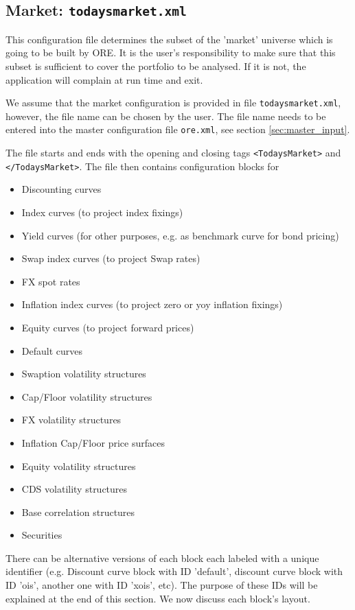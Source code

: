 \documentclass[12pt, a4paper]{article}
\begin{document}
\subsection{Market: {\tt todaysmarket.xml}}\label{sec:market}

This configuration file determines the subset of the 'market' universe which is going to be built by ORE. It is the
user's responsibility to make sure that this subset is sufficient to cover the portfolio to be analysed. If it is not,
the application will complain at run time and exit.

\medskip We assume that the market configuration is provided in file {\tt todaysmarket.xml}, however, the file name can
be chosen by the user. The file name needs to be entered into the master configuration file {\tt ore.xml}, see section
\ref{sec:master_input}.

\medskip 
The file starts and ends with the opening and closing tags {\tt <TodaysMarket>} 
and {\tt </TodaysMarket>}. The file then contains configuration blocks for
\begin{itemize}
\item Discounting curves
\item Index curves (to project index fixings)
\item Yield curves (for other purposes, e.g. as benchmark curve for bond pricing)
\item Swap index curves (to project Swap rates)
\item FX spot rates
\item Inflation index curves (to project zero or yoy inflation fixings)
\item Equity curves (to project forward prices)
\item Default curves
\item Swaption volatility structures
\item Cap/Floor volatility structures
\item FX volatility structures
\item Inflation Cap/Floor price surfaces
\item Equity volatility structures
\item CDS volatility structures
\item Base correlation structures
\item Securities
\end{itemize}

There can be alternative versions of each block each labeled with a unique identifier (e.g. Discount curve block with ID
'default', discount curve block with ID 'ois', another one with ID 'xois', etc). The purpose of these IDs will be
explained at the end of this section. We now discuss each block's layout.
\end{document}
